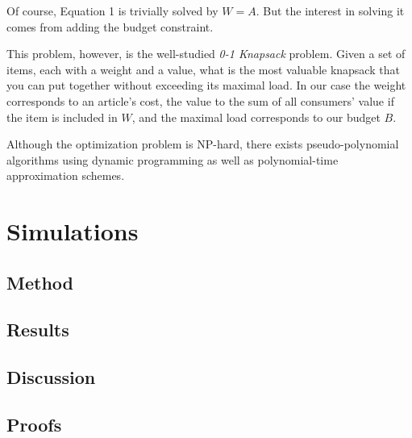 \documentclass{article}
\begin{document}
Of course, Equation 1 is trivially solved by $W=A$. 
But the interest in solving it comes from adding the budget constraint.


This problem, however, is the well-studied {\em 0-1 Knapsack} problem. 
Given a set of items, each with a weight and a value, 
what is the most valuable knapsack that you can put together without exceeding its maximal load. 
In our case the weight corresponds to an article's cost, 
the value to the sum of all consumers' value if the item is included in $W$, 
and the maximal load corresponds to our budget $B$. 

Although the optimization problem is NP-hard, there exists pseudo-polynomial algorithms using dynamic programming 
as well as polynomial-time approximation schemes. 
\section{Simulations}%
\subsection{Method}
\subsection{Results}
\subsection{Discussion}
\subsection{Proofs}


%
%
\end{document}

